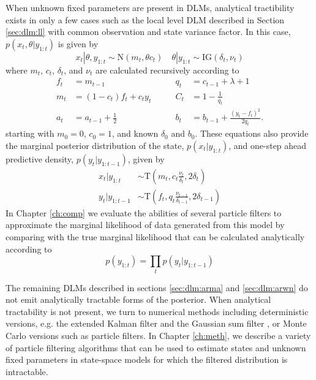 When unknown fixed parameters are present in DLMs, analytical tractibility exists in only a few cases such as the local level DLM described in Section \ref{sec:dlm:ll} with common observation and state variance factor. In this case, $p(x_t,\theta|y_{1:t})$ is given by
\begin{equation}
x_t|\theta,y_{1:t} \sim \mbox{N}(m_t,\theta c_t) \quad \theta|y_{1:t} \sim \mbox{IG}(\delta_t, \nu_t) \label{eqn:ll:post}
\end{equation}
where $m_t$, $c_t$, $\delta_t$, and $\nu_t$ are calculated recursively according to
\begin{align}
f_t &= m_{t-1} &\qquad q_t &= c_{t-1} + \lambda + 1 \label{eqn:ll:kal} \\
m_t &= (1 - c_t)f_t + c_ty_t &\qquad C_t &= 1 - \frac{1}{q_t} \nonumber \\
a_t &= a_{t-1} + \frac{1}{2} &\qquad b_t &= b_{t-1} + \frac{(y_t-f_t)^2}{2q_t}. \nonumber
\end{align}
starting with $m_0 = 0$, $c_0 = 1$, and known $\delta_0$ and $b_0$. These equations also provide the marginal posterior distribution of the state, $p(x_t|y_{1:t})$, and one-step ahead predictive density, $p(y_t|y_{1:t-1})$, given by
\begin{align}
x_t|y_{1:t} &\sim \mbox{T}(m_t,c_t \frac{\nu_t}{\delta_t},2\delta_t) \label{eqn:ll:marg} \\
y_t|y_{1:t-1} &\sim \mbox{T}(f_t,q_t \frac{\nu_{t-1}}{\delta_{t-1}},2\delta_{t-1}) \label{eqn:ll:onestep}
\end{align}
In Chapter \ref{ch:comp} we evaluate the abilities of several particle filters to approximate the marginal likelihood of data generated from this model by comparing with the true marginal likelihood that can be calculated analytically according to
\begin{equation}
p(y_{1:t}) = \prod_t p(y_t|y_{1:t-1}) \label{eqn:ll:marglik}
\end{equation}

The remaining DLMs described in sections \ref{sec:dlm:arma} and \ref{sec:dlm:arwn} do not emit analytically tractable forms of the posterior. When analytical tractability is not present, we turn to numerical methods including deterministic versions, e.g. the extended Kalman filter \cite[Sec 1.6][]{hay:2001:kal} and the Gaussian sum filter \citep{Alsp:Sore:nonl:1972}, or Monte Carlo versions such as particle filters. In Chapter \ref{ch:meth}, we describe a variety of particle filtering algorithms that can be used to estimate states and unknown fixed parameters in state-space models for which the filtered distribution is intractable.